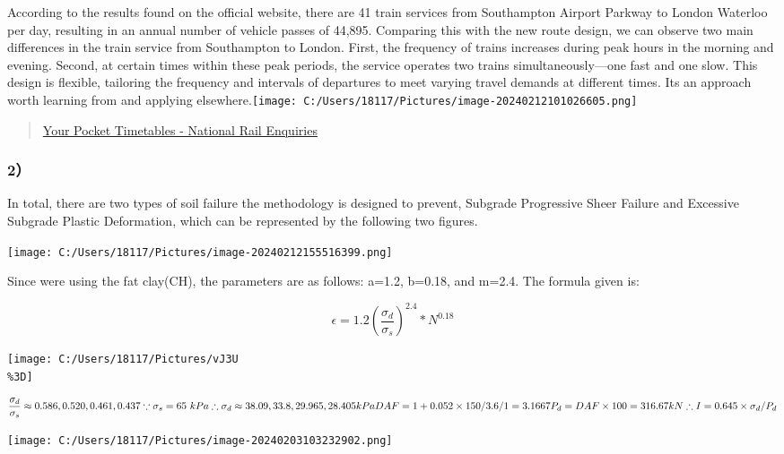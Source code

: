 \documentclass[
]{article}
\begin{document}
According to the results found on the official website, there are 41
train services from Southampton Airport Parkway to London Waterloo per
day, resulting in an annual number of vehicle passes of 44,895.
Comparing this with the new route design, we can observe two main
differences in the train service from Southampton to London. First, the
frequency of trains increases during peak hours in the morning and
evening. Second, at certain times within these peak periods, the service
operates two trains simultaneously---one fast and one slow. This design
is flexible, tailoring the frequency and intervals of departures to meet
varying travel demands at different times. It\textquotesingle s an
approach worth learning from and applying
elsewhere.\texttt{[image: C:/Users/18117/Pictures/image-20240212101026605.png]}

\begin{quote}
\href{https://ojp.nationalrail.co.uk/service/pockettimetable/search}{Your
Pocket Timetables - National Rail Enquiries}
\end{quote}

\subsubsection{2）}\label{2uxff09}

In total, there are two types of soil failure the methodology is
designed to prevent, Subgrade Progressive Sheer Failure and Excessive
Subgrade Plastic Deformation, which can be represented by the following
two figures.

\texttt{[image: C:/Users/18117/Pictures/image-20240212155516399.png]}

Since we\textquotesingle re using the fat clay(CH), the parameters are
as follows: a=1.2, b=0.18, and m=2.4. The formula given is:

\[\epsilon=1.2(\frac{\sigma_d}{\sigma_s})^{2.4}*N^{0.18}\]

\texttt{[image: C:/Users/18117/Pictures/vJ3U\\\%3D]}

\[\frac{\sigma_d}{\sigma_s} \approx 0.586, 0.520, 0.461, 0.437\\
\because \sigma_s=65\ kPa\\
\therefore \sigma_d\approx38.09,33.8,29.965,28.405 kPa\\
DAF=1+0.052\times150/3.6/1=3.1667\\
P_d=DAF\times100=316.67kN\\
\therefore I=0.645\times\sigma_d/P_d\]

\texttt{[image: C:/Users/18117/Pictures/image-20240203103232902.png]}
\end{document}

